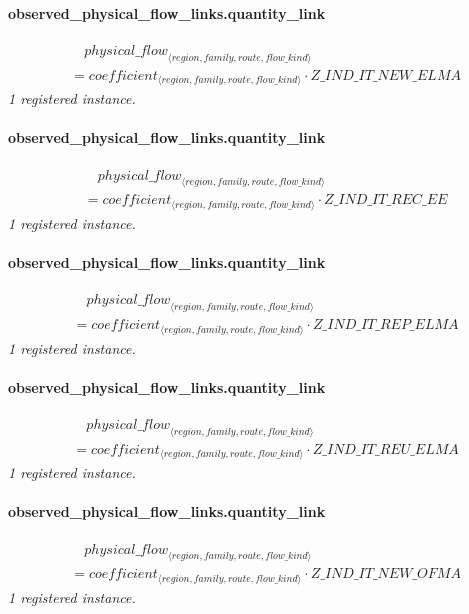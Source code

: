 \documentclass[11pt]{article}
\begin{document}
\paragraph{observed\_physical\_flow\_links.quantity\_link}
\begin{align*}
&\quad {physical\_flow}_{\langle region, family, route, flow\_kind\rangle}\\
&= coefficient_{\langle region, family, route, flow\_kind\rangle} \cdot Z\_IND\_IT\_NEW\_ELMA
\end{align*}
\noindent\emph{1 registered instance.}\par
\paragraph{observed\_physical\_flow\_links.quantity\_link}
\begin{align*}
&\quad {physical\_flow}_{\langle region, family, route, flow\_kind\rangle}\\
&= coefficient_{\langle region, family, route, flow\_kind\rangle} \cdot Z\_IND\_IT\_REC\_EE
\end{align*}
\noindent\emph{1 registered instance.}\par
\paragraph{observed\_physical\_flow\_links.quantity\_link}
\begin{align*}
&\quad {physical\_flow}_{\langle region, family, route, flow\_kind\rangle}\\
&= coefficient_{\langle region, family, route, flow\_kind\rangle} \cdot Z\_IND\_IT\_REP\_ELMA
\end{align*}
\noindent\emph{1 registered instance.}\par
\paragraph{observed\_physical\_flow\_links.quantity\_link}
\begin{align*}
&\quad {physical\_flow}_{\langle region, family, route, flow\_kind\rangle}\\
&= coefficient_{\langle region, family, route, flow\_kind\rangle} \cdot Z\_IND\_IT\_REU\_ELMA
\end{align*}
\noindent\emph{1 registered instance.}\par
\paragraph{observed\_physical\_flow\_links.quantity\_link}
\begin{align*}
&\quad {physical\_flow}_{\langle region, family, route, flow\_kind\rangle}\\
&= coefficient_{\langle region, family, route, flow\_kind\rangle} \cdot Z\_IND\_IT\_NEW\_OFMA
\end{align*}
\noindent\emph{1 registered instance.}\par
\end{document}
